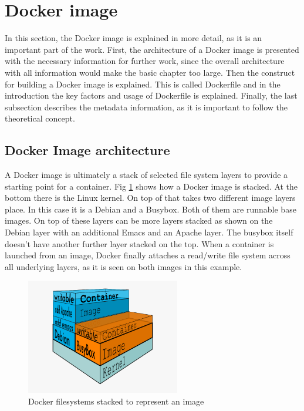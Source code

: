 \section{Docker image}
\label{sec:intro:docker_image:docker_img}
In this section, the Docker image is explained in more detail, as it is an important part of the work. First, the architecture of a Docker image is presented with the necessary information for further work, since the overall architecture with all information would make the basic chapter too large. Then the construct for building a Docker image is explained. This is called Dockerfile and in the introduction the key factors and usage of Dockerfile is explained. 
Finally, the last subsection describes the metadata information, as it is important to follow the theoretical concept.

\subsection{Docker Image architecture}
\label{sec:intro:docker_image:docker_img:architecture}
A Docker image is ultimately a stack of selected file system layers to provide a starting point for a container.
Fig \ref{sec:intro:docker_image:docker_image_stack} shows how a Docker image is stacked. At the bottom there is the Linux kernel. On top of that takes two different image layers place. In this case it is a Debian and a Busybox.
Both of them are runnable base images.
On top of these layers can be more layers stacked as shown on the Debian layer with an additional Emacs and an Apache layer. The busybox itself doesn't have another further layer stacked on the top.
When a container is launched from an image, Docker finally attaches a read/write file system across all underlying layers, as it is seen on both images in this example.

\begin{figure}[htbp]
 \centering
 \includegraphics[width=0.6\textwidth]{gfx/examples/docker-filesystems-busyboxrw}
 \caption{Docker filesystems stacked to represent an image}
\label{sec:intro:docker_image:docker_image_stack}
\end{figure}

